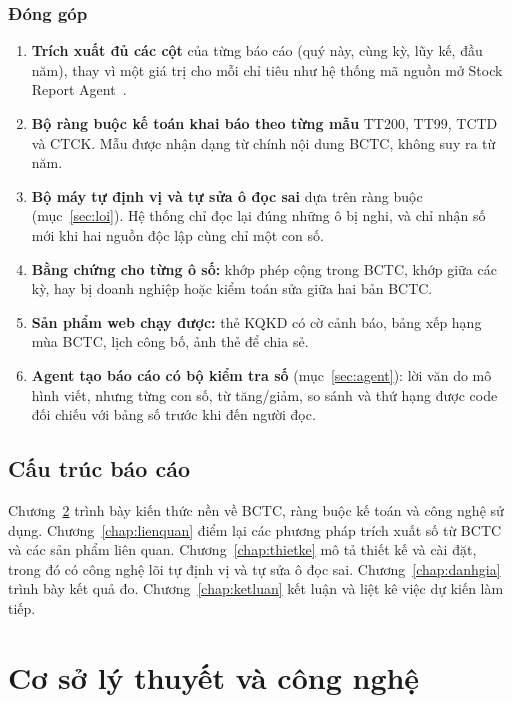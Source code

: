 \documentclass[12pt,a4paper]{report}
\begin{document}
\subsection{Đóng góp}\label{sec:donggop}
\begin{enumerate}
  \item \textbf{Trích xuất đủ các cột} của từng báo cáo (quý này, cùng kỳ, lũy kế, đầu năm), thay vì một giá trị cho mỗi chỉ tiêu như
        hệ thống mã nguồn mở Stock Report Agent~\cite{prevcohort}.
  \item \textbf{Bộ ràng buộc kế toán khai báo theo từng mẫu} TT200, TT99, TCTD và CTCK. Mẫu được nhận dạng từ chính nội
        dung BCTC, không suy ra từ năm.
  \item \textbf{Bộ máy tự định vị và tự sửa ô đọc sai} dựa trên ràng buộc (mục~\ref{sec:loi}). Hệ thống chỉ đọc lại đúng
        những ô bị nghi, và chỉ nhận số mới khi hai nguồn độc lập cùng chỉ một con số.
  \item \textbf{Bằng chứng cho từng ô số:} khớp phép cộng trong BCTC, khớp giữa các kỳ, hay bị doanh nghiệp hoặc kiểm
        toán sửa giữa hai bản BCTC.
  \item \textbf{Sản phẩm web chạy được:} thẻ KQKD có cờ cảnh báo, bảng xếp hạng mùa BCTC, lịch công bố, ảnh thẻ để chia
        sẻ.
  \item \textbf{Agent tạo báo cáo có bộ kiểm tra số} (mục~\ref{sec:agent}): lời văn do mô hình viết, nhưng từng con số,
        từ tăng/giảm, so sánh và thứ hạng được code đối chiếu với bảng số trước khi đến người đọc.
\end{enumerate}

\section{Cấu trúc báo cáo}
Chương~\ref{chap:nen} trình bày kiến thức nền về BCTC, ràng buộc kế toán và công nghệ sử dụng.
Chương~\ref{chap:lienquan} điểm lại các phương pháp trích xuất số từ BCTC và các sản phẩm liên quan. Chương~\ref{chap:thietke} mô tả
thiết kế và cài đặt, trong đó có công nghệ lõi tự định vị và tự sửa ô đọc sai. Chương~\ref{chap:danhgia} trình bày kết
quả đo. Chương~\ref{chap:ketluan} kết luận và liệt kê việc dự kiến làm tiếp.

\chapter{Cơ sở lý thuyết và công nghệ}\label{chap:nen}
\end{document}
